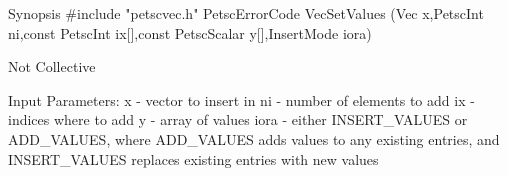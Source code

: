 Synopsis
#include "petscvec.h"
PetscErrorCode  VecSetValues
   (Vec x,PetscInt ni,const PetscInt
    ix[],const PetscScalar y[],InsertMode iora)

Not Collective

Input Parameters:
x - vector to insert in
ni - number of elements to add
ix - indices where to add
y - array of values
iora - either INSERT_VALUES or ADD_VALUES, where 
    ADD_VALUES adds values to any existing entries, and
    INSERT_VALUES replaces existing entries with new values
